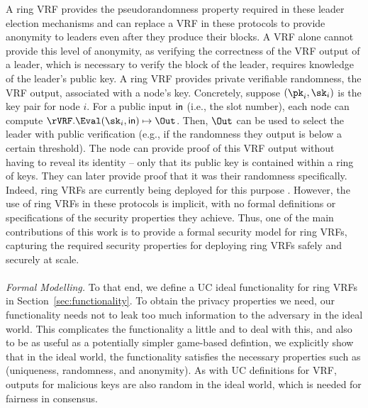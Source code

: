 A ring VRF provides the pseudorandomness property required in these leader election mechanisms and can replace a VRF in these protocols to provide anonymity to leaders even after they produce their blocks.
A VRF alone cannot provide this level of anonymity, as verifying the correctness of the VRF output  of a leader, which is necessary to verify the block of the leader, requires knowledge of the leader's public key.
A ring VRF provides private verifiable
randomness, the VRF output, associated with a node's key.
Concretely, suppose $(\pk_i, \sk_i)$ is the key pair for node $i$.
For a public input $\mathsf{in}$ (i.e., the slot number),
each node can compute $\rVRF.\Eval(\sk_i,\msg) \mapsto \Out$. Then,
$\Out$ can be used to select the leader with public verification (e.g., if the randomness they output is below a certain threshold).
The node can provide proof of
this VRF output without having to reveal its identity -- only that its public key is contained within a ring of keys.
They can later provide proof that it was their randomness specifically.
Indeed, ring VRFs are currently being deployed for this purpose \cite{Semaphore,BurdgesASV23a}.
However, the use of ring VRFs in these protocols is implicit, with no formal definitions or specifications of the security properties they achieve. 
Thus, one of the main contributions of this work is to provide a formal security model for ring VRFs, capturing the required security properties for deploying ring VRFs safely and securely at scale.
\\\\
\noindent \emph{Formal Modelling.} To that end,
we define a UC ideal functionality for ring VRFs in Section~\ref{sec:functionality}. To obtain the privacy properties we need, our functionality needs not to leak too much information to the adversary in the ideal world. This complicates the functionality a little and to deal with this, and also to be as useful as a potentially simpler game-based defintion, we explicitly show that in the ideal world, the functionality satisfies the necessary properties such as (uniqueness, randomness, and anonymity). As with UC definitions for VRF, outputs for malicious keys are also random in the ideal world, which is needed for fairness in consensus. 
